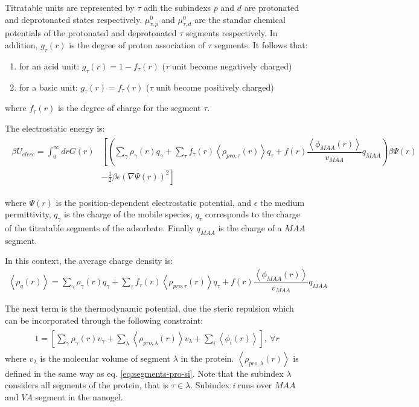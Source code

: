 Titratable units are represented by $\tau$  adh the subindexs  $p$ and $d$ are protonated and deprotonated states respectively.
$\mu^0_{\tau,p}$ and $\mu^0_{\tau,d}$ are the standar chemical potentials of the protonated and deprotonated $\tau$ segments respectively.
In addition, $g_\tau(r)$ is the degree of proton association of $\tau$ segments. It follows that: 
\begin{enumerate}
	\item for an acid unit: $g_\tau(r) = 1-f_\tau(r)$ ($\tau$ unit become negatively charged)
	\item for a basic unit: $g_\tau(r) = f_\tau(r)$ ($\tau$ unit become positively charged)
\end{enumerate}
where $f_\tau(r)$ is the degree of charge for the segment $\tau$.

The electrostatic  energy is:
\begin{align}
	\begin{aligned}
		\beta U_{elecc}= \int_0^\infty drG(r)&\left[\left(\sum_{\gamma } {\rho_\gamma(r) q_\gamma + \sum_\tau{f_\tau(r) \left<\rho_{pro,\tau}(r)\right> q_\tau} +  f(r)\dfrac{\left<\phi_{MAA}(r)\right>}{v_{MAA}}q_{MAA}}\right)\beta\Psi(r) \right. \\ &\left.-\frac{1}{2}\beta\epsilon(\nabla\Psi(r))^2 \right]
	\end{aligned}
\end{align} 

\noindent where $\Psi(r)$ is the position-dependent electrostatic potential, and $\epsilon$ the medium permittivity, $q_\gamma$ is the charge of the mobile species, $q_\tau$ corresponds to the charge of the titratable segments of the adsorbate. Finally $q_{MAA}$ is the charge of a $MAA$ segment.

In this context, the average charge density is:
\begin{align}
	\left<\rho_q(r)\right> = \sum_{\gamma } {\rho_\gamma(r) q_\gamma + \sum_\tau{f_\tau(r) \left<\rho_{pro,\tau}(r)\right> q_\tau} +  f(r)\dfrac{\left<\phi_{MAA}(r)\right>}{v_{MAA}}q_{MAA}}
	\label{eq:esf:rho-charge}
\end{align}

The next term is the  thermodynamic potential, due the steric repulsion which can be incorporated through the following constraint:
\begin{align}
	\begin{aligned}
		1=  {\left[\sum_{\gamma}\rho_\gamma(r) v_\gamma + \sum_\lambda{\left<\rho_{pro,\lambda}(r)\right>v_\lambda} + \sum_i{\left<\phi_i(r)\right>}\right]},~ \forall r
	\end{aligned}
	\label{eq:esf:constraint}
\end{align}
\noindent where $v_\lambda$ is the molecular volume of segment $\lambda$ in the protein.
$\left<\rho_{pro,\lambda}(r)\right>$ is defined in the same way as  eq. \ref{eq:segments-pro-si}.
Note that the subindex $\lambda$ considers all segments of the protein, that is $ \tau \in \lambda$.
Subindex \textit{i} runs over $MAA$ and $VA$ segment in the nanogel.

